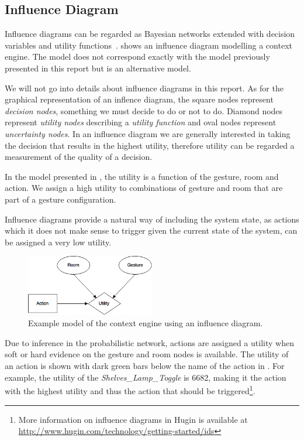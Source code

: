 \subsection{Influence Diagram}

Influence diagrams can be regarded as Bayesian networks extended with decision variables and utility functions~\cite{kjaerulff2008bayesian}.  shows an influence diagram modelling a context engine. The model does not correspond exactly with the model previously presented in this report but is an alternative model.

We will not go into details about influence diagrams in this report. As for the graphical representation of an inflence diagram, the square nodes represent \emph{decision nodes}, \ie something we must decide to do or not to do. Diamond nodes represent \emph{utility nodes} describing a \emph{utility function} and oval nodes represent \emph{uncertainty nodes}. In an influence diagram we are generally interested in taking the decision that results in the highest utility, therefore utility can be regarded a measurement of the quality of a decision.

In the model presented in , the utility is a function of the gesture, room and action. We assign a high utility to combinations of gesture and room that are part of a gesture configuration. 

Influence diagrams provide a natural way of including the system state, as actions which it does not make sense to trigger given the current state of the system, can be assigned a very low utility.

\begin{figure}[!h]
\centering
\includegraphics[width=0.50\textwidth]{images/influence-diagram}
\caption{Example model of the context engine using an influence diagram.}
\label{fig:evaluation:alternative-models:influence-diagram}
\end{figure}

Due to inference in the probabilistic network, actions are assigned a utility when soft or hard evidence on the gesture and room nodes is available. The utility of an action is shown with dark green bars below the name of the action in . For example, the utility of the \emph{Shelves\_Lamp\_Toggle} is 6682, making it the action with the highest utility and thus the action that should be triggered\footnote{More information on influence diagrams in Hugin is available at \url{http://www.hugin.com/technology/getting-started/ids}}.


